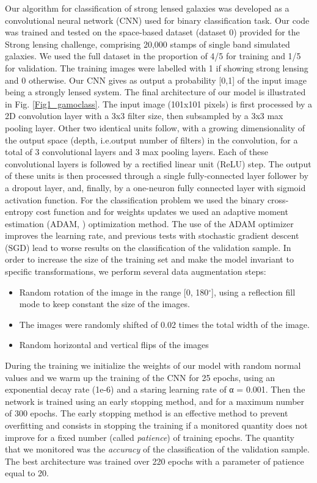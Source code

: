 \documentclass[useAMS,usenatbib]{mnras}
\newcommand{\degree}{^{\circ}}
\begin{document}
Our algorithm for classification of strong lensed galaxies was developed as a convolutional neural network (CNN) used for binary classification task.
Our code was trained and tested on the space-based dataset (dataset 0) provided for the Strong lensing challenge, comprising 20,000 stamps of single band simulated galaxies. We used the full dataset in the proportion of 4/5 for training and 1/5 for validation. The training images were labelled with 1 if showing strong lensing and 0 otherwise. Our CNN gives as output a probability [0,1] of the input image being a strongly lensed system.
The final architecture of our model is illustrated in Fig. \ref{Fig1_gamoclass}. The input image (101x101 pixels) is first processed by a 2D convolution layer with a 3x3 filter size, then subsampled by a 3x3 max pooling layer. Other two identical units follow, with a growing dimensionality of the output space (depth, i.e.output number of filters) in the convolution, for a total of 3 convolutional layers and 3 max pooling layers. Each of these convolutional layers is followed by a rectified linear unit (ReLU) step. The output of these units is then processed through a single fully-connected layer follower by a dropout layer, and, finally, by a one-neuron fully connected layer with sigmoid activation function. For the classification problem we used the binary cross-entropy cost function and for weights updates we used an adaptive moment estimation (ADAM, \citealt{Kingma_2014}) optimization method. The use of the ADAM optimizer improves the learning rate, and previous tests with stochastic gradient descent (SGD) lead to worse results on the classification of the validation sample.
In order to increase the size of the training set and make the model invariant to specific transformations, we perform several data augmentation steps:
\begin{itemize}
\item Random rotation of the image in the range [0, 180$\degree$], using a reflection fill mode to keep constant the size of the images.
\item The images were randomly shifted of 0.02 times the total width of the image.
\item Random horizontal and vertical flips of the images
\end{itemize}
During the training we initialize the weights of our model with random normal values and we warm up the training \citet{Huang_2016} of the CNN for 25 epochs, using an exponential decay rate (1e-6) and a staring learning rate of α = 0.001. Then the network is trained using an early stopping method, and for a maximum number of 300 epochs. The early stopping method is an effective method to prevent overfitting and consists in stopping the training if a monitored quantity does not improve for a fixed number (called \textit{patience}) of training epochs. The quantity that we monitored was the \textit{accuracy} of the classification of the validation sample. The best architecture was trained over 220 epochs with a parameter of patience equal to 20.
\end{document}
